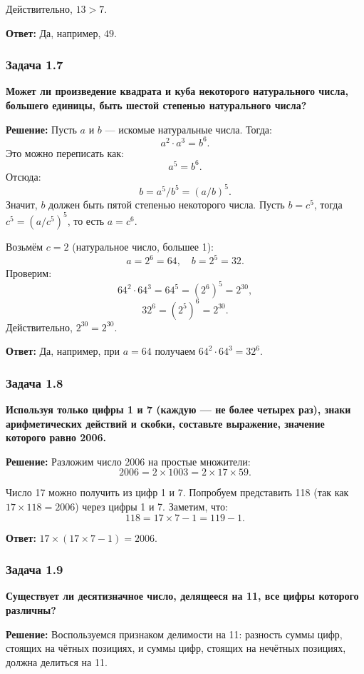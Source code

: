\documentclass[12pt, a4paper]{article}
\begin{document}
Действительно, $13 > 7$.

\textbf{Ответ:} Да, например, $49$.

\subsubsection*{Задача 1.7}
\textbf{Может ли произведение квадрата и куба некоторого натурального числа, большего единицы, быть шестой степенью натурального числа?}

\textbf{Решение:}
Пусть $a$ и $b$ — искомые натуральные числа. Тогда:
\[
a^2 \cdot a^3 = b^6.
\]
Это можно переписать как:
\[
a^5 = b^6.
\]
Отсюда:
\[
b = a^5/b^5 = (a/b)^5.
\]
Значит, $b$ должен быть пятой степенью некоторого числа. Пусть $b = c^5$, тогда $c^5 = (a/c^5)^5$, то есть $a = c^6$.


Возьмём $c = 2$ (натуральное число, большее 1):
\[
a = 2^6 = 64,\quad b = 2^5 = 32.
\]
Проверим:
\[
64^2 \cdot 64^3 = 64^5 = (2^6)^5 = 2^{30},
\]
\[
32^6 = (2^5)^6 = 2^{30}.
\]
Действительно, $2^{30} = 2^{30}$.

\textbf{Ответ:} Да, например, при $a = 64$ получаем $64^2 \cdot 64^3 = 32^6$.

\subsubsection*{Задача 1.8}
\textbf{Используя только цифры 1 и 7 (каждую — не более четырех раз), знаки арифметических действий и скобки, составьте выражение, значение которого равно 2006.}

\textbf{Решение:}
Разложим число 2006 на простые множители:
\[
2006 = 2 \times 1003 = 2 \times 17 \times 59.
\]

Число 17 можно получить из цифр 1 и 7. Попробуем представить 118 (так как $17 \times 118 = 2006$) через цифры 1 и 7. Заметим, что:
\[
118 = 17 \times 7 - 1 = 119 - 1.
\]

\textbf{Ответ:} $17 \times (17 \times 7 - 1) = 2006$.

\subsubsection*{Задача 1.9}
\textbf{Существует ли десятизначное число, делящееся на 11, все цифры которого различны?}

\textbf{Решение:}
Воспользуемся признаком делимости на 11: разность суммы цифр, стоящих на чётных позициях, и суммы цифр, стоящих на нечётных позициях, должна делиться на 11.
\end{document}
